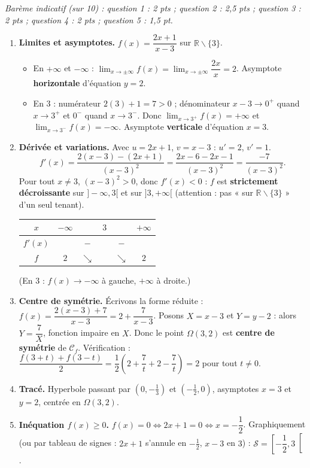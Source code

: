 \documentclass[11pt]{article}
\def\setminus{\mathbin{\backslash}}\let\smallsetminus\setminus
\begin{document}
\begin{corrige}
\emph{Barème indicatif (sur 10) : question 1 : 2 pts ; question 2 : 2,5 pts ; question 3 : 2 pts ; question 4 : 2 pts ; question 5 : 1,5 pt.}

\begin{enumerate}
    \item \textbf{Limites et asymptotes.} $f(x)=\dfrac{2x+1}{x-3}$ sur $\mathbb{R}\setminus\{3\}$.
    \begin{itemize}
        \item En $+\infty$ et $-\infty$ : $\lim_{x \to \pm\infty} f(x) = \lim_{x \to \pm\infty} \dfrac{2x}{x} = 2$. Asymptote \textbf{horizontale} d'équation $y=2$.
        \item En $3$ : numérateur $2(3)+1=7>0$ ; dénominateur $x-3 \to 0^+$ quand $x \to 3^+$ et $0^-$ quand $x \to 3^-$. Donc $\lim_{x \to 3^+} f(x)=+\infty$ et $\lim_{x \to 3^-} f(x)=-\infty$. Asymptote \textbf{verticale} d'équation $x=3$.
    \end{itemize}
    \item \textbf{Dérivée et variations.} Avec $u=2x+1$, $v=x-3$ : $u'=2$, $v'=1$.
    \[ f'(x)=\frac{2(x-3)-(2x+1)}{(x-3)^2}=\frac{2x-6-2x-1}{(x-3)^2}=\frac{-7}{(x-3)^2}. \]
    Pour tout $x \neq 3$, $(x-3)^2>0$, donc $f'(x)<0$ : $f$ est \textbf{strictement décroissante} sur $]-\infty,3[$ et sur $]3,+\infty[$ (attention : pas « sur $\mathbb{R}\setminus\{3\}$ » d'un seul tenant).
    \begin{center}
    \begin{tabular}{|c|ccccc|}\hline
    $x$ & $-\infty$ & & $3$ & & $+\infty$ \\ \hline
    $f'(x)$ & & $-$ & & $-$ & \\ \hline
    $f$ & $2$ & $\searrow$ & & $\searrow$ & $2$ \\ \hline
    \end{tabular}
    \end{center}
    (En $3$ : $f(x) \to -\infty$ à gauche, $+\infty$ à droite.)
    \item \textbf{Centre de symétrie.} Écrivons la forme réduite : $f(x)=\dfrac{2(x-3)+7}{x-3}=2+\dfrac{7}{x-3}$. Posons $X=x-3$ et $Y=y-2$ : alors $Y=\dfrac{7}{X}$, fonction impaire en $X$. Donc le point $\Omega(3,2)$ est \textbf{centre de symétrie} de $\mathcal{C}_f$. Vérification : $\dfrac{f(3+t)+f(3-t)}{2}=\dfrac{1}{2}\left(2+\dfrac{7}{t}+2-\dfrac{7}{t}\right)=2$ pour tout $t \neq 0$.
    \item \textbf{Tracé.} Hyperbole passant par $(0,-\tfrac{1}{3})$ et $(-\tfrac{1}{2},0)$, asymptotes $x=3$ et $y=2$, centrée en $\Omega(3,2)$.
    \item \textbf{Inéquation $f(x) \geqslant 0$.} $f(x)=0 \iff 2x+1=0 \iff x=-\dfrac{1}{2}$. Graphiquement (ou par tableau de signes : $2x+1$ s'annule en $-\tfrac12$, $x-3$ en $3$) : $\mathcal{S}=\left[-\dfrac{1}{2}, 3\right[$.
    

\end{enumerate}
\end{corrige}
\end{document}
